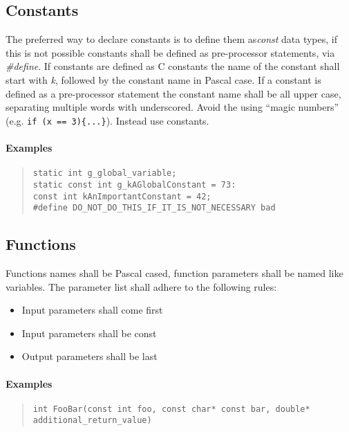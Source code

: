 \documentclass[final,a4paper,10pt, oneside]{article}
\begin{document}
\subsection{Constants}
The preferred way to declare constants is to define them as\emph{const} data types, if this is not possible constants shall be defined as pre-processor statements, via \emph{\#define}.
If constants are defined as C constants the name of the constant shall start with \emph{k}, followed by the constant name in Pascal case.
If a constant is defined as a pre-processor statement the constant name shall be all upper case, separating multiple words with underscored.
Avoid the using ``magic numbers'' (e.g. \verb|if (x == 3){...}|). Instead use constants.

\paragraph{Examples}
\begin{quote}
\begin{lstlisting}
static int g_global_variable;
static const int g_kAGlobalConstant = 73:
const int kAnImportantConstant = 42;
#define DO_NOT_DO_THIS_IF_IT_IS_NOT_NECESSARY bad
\end{lstlisting}
\end{quote}

\subsection{Functions}
Functions names shall be Pascal cased, function parameters shall be named like variables. The parameter list shall adhere to the following rules:
\begin{itemize}
	\item Input parameters shall come first
	\item Input parameters shall be const
	\item Output parameters shall be last
\end{itemize}

\paragraph{Examples}
\begin{quote}
\begin{lstlisting}
int FooBar(const int foo, const char* const bar, double* additional_return_value)
\end{lstlisting}
\end{quote}
\end{document}
